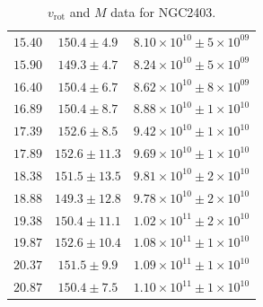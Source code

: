 \documentclass{article}
\newcommand\vrot{\ensuremath{v_{\textrm{rot}}}}
\begin{document}
\begin{table}[h!]
\begin{tabular}{|c|c|c|}
        $15.40$ & $150.4 \pm 4.9$ & $8.10\times 10^{10} \pm 5\times 10^{09}$ \\
        $15.90$ & $149.3 \pm 4.7$ & $8.24\times 10^{10} \pm 5\times 10^{09}$ \\
        $16.40$ & $150.4 \pm 6.7$ & $8.62\times 10^{10} \pm 8\times 10^{09}$ \\
        $16.89$ & $150.4 \pm 8.7$ & $8.88\times 10^{10} \pm 1\times 10^{10}$ \\
        $17.39$ & $152.6 \pm 8.5$ & $9.42\times 10^{10} \pm 1\times 10^{10}$ \\
        $17.89$ & $152.6 \pm 11.3$ & $9.69\times 10^{10} \pm 1\times 10^{10}$ \\
        $18.38$ & $151.5 \pm 13.5$ & $9.81\times 10^{10} \pm 2\times 10^{10}$ \\
        $18.88$ & $149.3 \pm 12.8$ & $9.78\times 10^{10} \pm 2\times 10^{10}$ \\
        $19.38$ & $150.4 \pm 11.1$ & $1.02\times 10^{11} \pm 2\times 10^{10}$ \\
        $19.87$ & $152.6 \pm 10.4$ & $1.08\times 10^{11} \pm 1\times 10^{10}$ \\
        $20.37$ & $151.5 \pm 9.9$ & $1.09\times 10^{11} \pm 1\times 10^{10}$ \\
        $20.87$ & $150.4 \pm 7.5$ & $1.10\times 10^{11} \pm 1\times 10^{10}$ \\
        \hline
    \end{tabular}
    \caption{$\vrot$ and $M$ data for NGC2403.}
    \label{tab:proc2403}
\end{table}
\doublespacing
\end{document}
